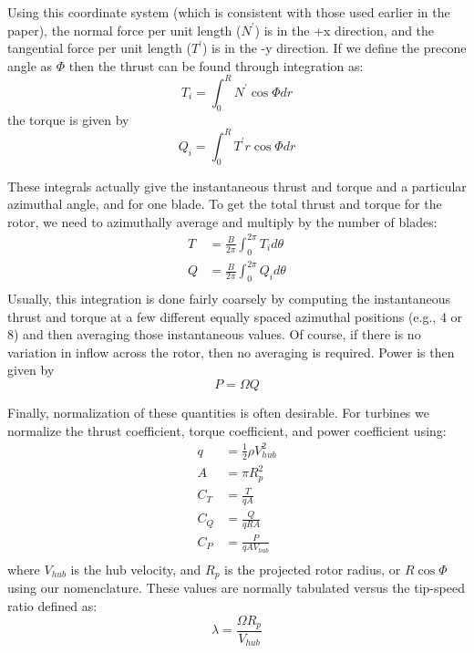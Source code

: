 Using this coordinate system (which is consistent with those used earlier in the paper), the normal force per unit length ($N^\prime$) is in the +x direction, and the tangential force per unit length ($T^\prime$) is in the -y direction.  If we define the precone angle as $\Phi$ then the thrust can be found through integration as:
\begin{equation}
   T_i = \int_0^R N^\prime \cos\Phi dr
\end{equation}
the torque is given by
\begin{equation}
    Q_i = \int_0^R T^\prime r \cos\Phi dr
\end{equation}

These integrals actually give the instantaneous thrust and torque and a particular azimuthal angle, and for one blade.  To get the total thrust and torque for the rotor, we need to azimuthally average and multiply by the number of blades:
\begin{equation}
\begin{aligned}
    T &= \frac{B}{2\pi}\int_0^{2\pi} T_i d\theta\\
    Q &= \frac{B}{2\pi}\int_0^{2\pi} Q_i d\theta\\
\end{aligned}
\end{equation}
Usually, this integration is done fairly coarsely by computing the instantaneous thrust and torque at a few different equally spaced azimuthal positions (e.g., 4 or 8) and then averaging those instantaneous values.  Of course, if there is no variation in inflow across the rotor, then no averaging is required.  Power is then given by
\begin{equation}
    P = \Omega Q
\end{equation}

Finally, normalization of these quantities is often desirable.  For turbines we normalize the thrust coefficient, torque coefficient, and power coefficient using:
\begin{equation}
\begin{aligned}
q &= \frac{1}{2} \rho V_{hub}^2\\
A &= \pi R_p^2\\
C_T &= \frac{T}{q A}\\
C_Q &= \frac{Q}{q R A}\\
C_P &= \frac{P}{q A V_{hub}}\\
\end{aligned}
\end{equation}
where $V_{hub}$ is the hub velocity, and $R_p$ is the projected rotor radius, or $R \cos\Phi$ using our nomenclature.  These values are normally tabulated versus the tip-speed ratio defined as:
\begin{equation}
    \lambda = \frac{\Omega R_p}{V_{hub}}
\end{equation}

